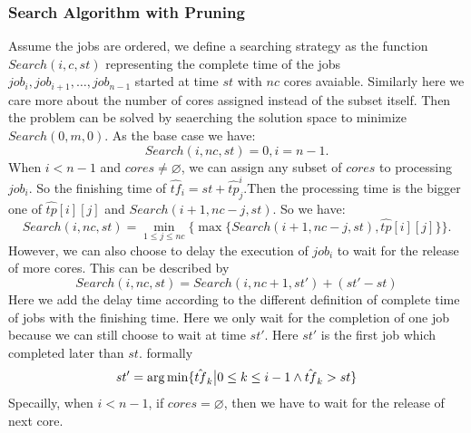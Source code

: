 \documentclass{llncs}
\begin{document}
\subsubsection{Search Algorithm with Pruning}
  Assume the jobs are ordered, we define a searching strategy as the function $Search(i,c,st)$ representing the complete time of the jobs $job_i,job_{i+1},\dots,job_{n-1}$ started at time $st$ with $nc$ cores avaiable. Similarly here we care more about the number of cores assigned instead of the subset itself. Then the problem can be solved by seaerching the solution space to minimize $Search(0,m,0)$. As the base case we have:
  \begin{equation}
  Search(i,nc,st) = 0 , i = n-1.
  \end{equation}
  When $i<n-1$ and $cores \neq \varnothing$, we can assign any subset of $cores$ to processing $job_i$. So the finishing time of $\hat{tf}_i = st + \hat{tp}_j^i$.Then the processing time is the bigger one of $\hat{tp}[i][j]$ and $Search(i+1,nc-j,st)$. So we have:
    \begin{equation}
  Search(i,nc,st) = \min_{1\leq j \leq nc} \{\max \{Search(i+1,nc-j,st),\hat{tp}[i][j]\}\}.
    \end{equation}
  However, we can also choose to delay the execution of $job_i$ to wait for the release of more cores. This can be described by
  \begin{equation}
  Search(i,nc,st) = Search (i,nc+1,st') + (st' - st)
\end{equation}
  Here we add the delay time according to the different definition of complete time of jobs with the finishing time. Here we only wait for the completion of one job because we can still choose to wait at time $st'$. Here $st'$ is the first job which completed later than $st$. formally
  \begin{equation}
  st' = \arg \min \{\hat{tf}_k\big{|} 0\leq k \leq i-1 \land \hat{tf}_k > st\}
  \end{equation}
  Specailly, when $i<n-1$, if $cores = \varnothing$, then we have to wait for the release of next core.
\end{document}

